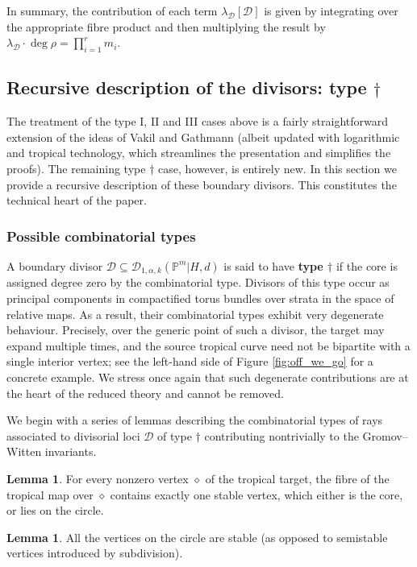 \documentclass[11pt]{amsart}
\newcommand{\PP}{\mathbb P}
\newcommand{\Dcal}{\mathcal{D}}
\theoremstyle{definition}
\newtheorem{lemma}[thm]{Lemma}
\theoremstyle{definition}
\begin{document}
In summary, the contribution of each term $\lambda_\Dcal [\Dcal]$ is given by integrating over the appropriate fibre product and then multiplying the result by $\lambda_\Dcal \cdot \deg\rho = \prod_{i=1}^r m_i$.

\subsection{Recursive description of the divisors: type $\dag$}\label{subsection C0 splitting} The treatment of the type I, II and III cases above is a fairly straightforward extension of the ideas of Vakil and Gathmann (albeit updated with logarithmic and tropical technology, which streamlines the presentation and simplifies the proofs). The remaining type $\dag$ case, however, is entirely new. In this section we provide a recursive description of these boundary divisors. This constitutes the technical heart of the paper.

\subsubsection{Possible combinatorial types}\label{S:combinatorialdescription} A boundary divisor $\Dcal \subseteq \Dcal_{1,\alpha,k}(\PP^m|H,d)$ is said to have \textbf{type $\dag$} if the core is assigned degree zero by the combinatorial type. Divisors of this type occur as principal components in compactified torus bundles over strata in the space of relative maps. As a result, their combinatorial types exhibit very degenerate behaviour. Precisely, over the generic point of such a divisor, the target may expand multiple times, and the source tropical curve need not be bipartite with a single interior vertex; see the left-hand side of Figure \ref{fig:off_we_go} for a concrete example. We stress once again that such degenerate contributions are at the heart of the reduced theory and cannot be removed.

We begin with a series of lemmas describing the combinatorial types of rays associated to divisorial loci $\Dcal$ of type $\dag$ contributing nontrivially to the Gromov--Witten invariants.
\begin{lemma} \label{lemma type C0 combinatorial types}
 For every nonzero vertex $\diamond$ of the tropical target, the fibre of the tropical map over $\diamond$ contains exactly one stable vertex, which either is the core, or lies on the circle.
\end{lemma}

\begin{lemma}\label{lem:stable_vertices} All the vertices on the circle are stable (as opposed to semistable  vertices introduced by subdivision). \end{lemma}
\end{document}

